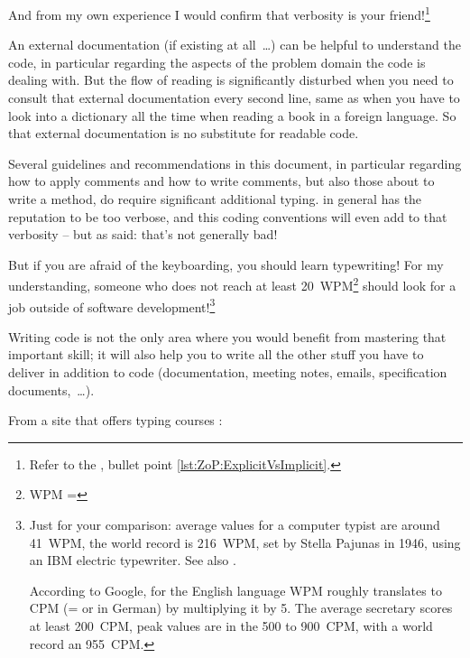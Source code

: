 And from my own experience I would confirm that verbosity is your friend!\footnote{Refer to the \ngref, bullet point \ref{lst:ZoP:ExplicitVsImplicit}.}

An external documentation (if existing at all~…) can be helpful to understand the code, in particular regarding the aspects of the problem domain the code is dealing with. But the flow of reading is significantly disturbed when you need to consult that external documentation every second line, same as when you have to look into a dictionary all the time when reading a book in a foreign language. So that external documentation is no substitute for readable code.

Several guidelines and recommendations in this document, in particular regarding how to apply comments and how to write comments, but also those about to write a method, do require significant additional typing. \Java in general has the reputation to be too verbose, and this coding conventions will even add to that verbosity – but as said: that's not generally bad!

But if you are afraid of the keyboarding, you should learn typewriting! For my understanding, someone who does not reach at least 20~WPM\footnote{WPM = } should look for a job outside of software development!\footnote{Just for your comparison: average values for a computer typist are around 41~WPM, the world record is 216~WPM, set by Stella Pajunas in 1946, using an IBM electric typewriter. See also \autocite{RATATYPE}.

According to Google, for the English language WPM roughly translates to CPM (=  or  in German) by multiplying it by 5. The average secretary scores at least 200~CPM, peak values are in the 500 to 900~CPM, with a world record an 955~CPM.}

Writing code is not the only area where you would benefit from mastering that important skill; it will also help you to write all the other stuff you have to deliver in addition to code (documentation, meeting notes, emails, specification documents,~…).

From a site that offers typing courses \autocite{RATATYPE}:

